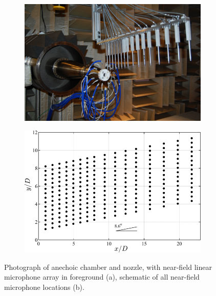 \begin{figure}
	\centering
	\begin{subfigure}{.5\textwidth}
		\centering
		\includegraphics[width=0.95\linewidth]{Figures/ch2_nearfield_separate.png}
	\end{subfigure}%
	\begin{subfigure}{.5\textwidth}
		\centering
		\includegraphics[width=0.95\linewidth]{Figures/NearField1_Schematic.png}
	\end{subfigure}
	\caption{Photograph of anechoic chamber and nozzle, with near-field linear microphone array in foreground (a), schematic of all near-field microphone locations (b).}
	\label{fig:ch2_nearfield}
\end{figure}

